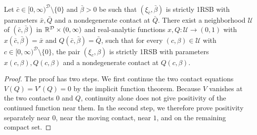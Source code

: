 \begin{lemma}\label{lem:th-openness}
Let $\bar c\in[0,\infty)^{\mathcal D}\setminus\{0\}$ and $\bar\beta>0$ be such that $(\xi_{\bar c},\bar\beta)$ is strictly 1RSB with parameters $\bar x,\bar Q$ and a nondegenerate contact at $\bar Q$. There exist a neighborhood $\mathcal U$ of $(\bar c,\bar\beta)$ in $\mathbb R^{\mathcal D}\times(0,\infty)$ and real-analytic functions $x,Q\colon\mathcal U\to(0,1)$ with $x(\bar c,\bar\beta)=\bar x$ and $Q(\bar c,\bar\beta)=\bar Q$, such that for every $(c,\beta)\in\mathcal U$ with $c\in[0,\infty)^{\mathcal D}\setminus\{0\}$, the pair $(\xi_c,\beta)$ is strictly 1RSB with parameters $x(c,\beta),Q(c,\beta)$ and a nondegenerate contact at $Q(c,\beta)$.
\end{lemma}

\begin{proof}
The proof has two steps. We first continue the two contact equations $V(Q)=V'(Q)=0$ by the implicit function theorem. Because $V$ vanishes at the two contacts $0$ and $Q$, continuity alone does not give positivity of the continued function near them. In the second step, we therefore prove positivity separately near $0$, near the moving contact, near $1$, and on the remaining compact set.


\end{proof}
